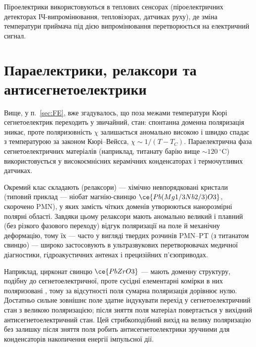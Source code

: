 Піроелектрики використовуються в теплових сенсорах (піроелектричних детекторах ІЧ-випромінювання, тепловізорах, датчиках руху), де зміна
температури приймача під дією випромінювання перетворюється на електричний сигнал.

\section{Параелектрики, релаксори та антисегнетоелектрики}

 Вище, у п.~\ref{sec:FE}, вже згадувалось, що поза межами температури Кюрі сегнетоелектрик переходить у звичайний,
 стан: спонтанна доменна поляризація зникає, проте поляризовність $\chi$ залишається аномально високою і швидко спадає з
температурою за законом Кюрі--Вейсса, $\chi \sim 1/(T-T_C)$. Параелектрична фаза сегнетоелектричних матеріалів (наприклад, титанату барію вище
$\sim\!120\ ^\circ\text{C}$) використовується у високоємнісних керамічних конденсаторах і термочутливих датчиках.

 Окремий клас складають  (релаксори) --- хімічно невпорядковані кристали (типовий приклад ---
ніобат магнію-свинцю $\ce{Pb(Mg1/3Nb2/3)O3}$, скорочено PMN), у яких замість чітких доменів утворюються нанорозмірні полярні області. Завдяки цьому
релаксори мають аномально великий і плавний (без різкого фазового переходу) відгук поляризації на поле й механічну деформацію, тому їх --- часто у
вигляді твердих розчинів PMN--PT (з титанатом свинцю) --- широко застосовують в ультразвукових перетворювачах медичної діагностики, гідроакустичних
антенах і прецизійних п'єзоприводах.

 Наприклад, цирконат свинцю $\ce{PbZrO3}$ --- мають доменну структуру, подібну до сегнетоелектричної, проте сусідні
елементарні комірки в них поляризовані , тому за відсутності поля сумарна поляризація дорівнює нулю. Достатньо сильне
зовнішнє поле здатне індукувати перехід у сегнетоелектричний стан з великою поляризацією; після зняття поля матеріал повертається у вихідний
антисегнетоелектричний стан. Цей стрибкоподібний вихід на велику поляризацію без залишку після зняття поля робить антисегнетоелектрики зручними
для конденсаторів накопичення енергії імпульсної дії.

